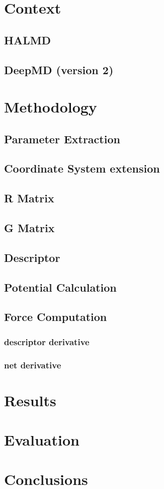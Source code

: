 \documentclass[a4paper,11pt,oneside]{article}
\begin{document}
\newpage

\section{Context}
\subsection{HALMD}
\subsection{DeepMD (version 2)}


\section{Methodology}
\subsection{Parameter Extraction}
\subsection{Coordinate System extension}
\subsection{R Matrix}
\subsection{G Matrix}
\subsection{Descriptor}
\subsection{Potential Calculation}
\subsection{Force Computation}
\subsubsection{descriptor derivative}

\subsubsection{net derivative}

\section{Results}

\section{Evaluation}

\section{Conclusions}

\nocite{loebenberger2006evolution}

\newpage

\printbibliography
\end{document}
